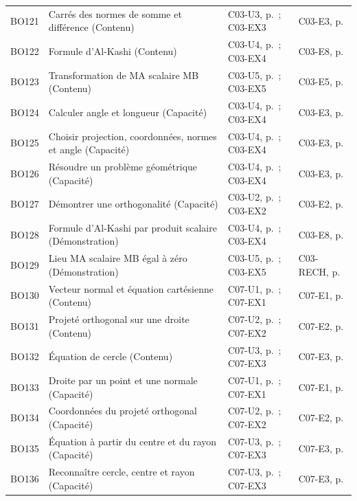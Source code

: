 \begin{longtable}{p{.1\linewidth}p{.43\linewidth}p{.19\linewidth}p{.16\linewidth}}
BO121 & Carrés des normes de somme et différence (Contenu) & C03-U3, p.\,\pageref{C03-U3} ; C03-EX3 & C03-E3, p.\,\pageref{C03-E3} \\
BO122 & Formule d’Al-Kashi (Contenu) & C03-U4, p.\,\pageref{C03-U4} ; C03-EX4 & C03-E8, p.\,\pageref{C03-E8} \\
BO123 & Transformation de MA scalaire MB (Contenu) & C03-U5, p.\,\pageref{C03-U5} ; C03-EX5 & C03-E5, p.\,\pageref{C03-E5} \\
BO124 & Calculer angle et longueur (Capacité) & C03-U4, p.\,\pageref{C03-U4} ; C03-EX4 & C03-E3, p.\,\pageref{C03-E3} \\
BO125 & Choisir projection, coordonnées, normes et angle (Capacité) & C03-U4, p.\,\pageref{C03-U4} ; C03-EX4 & C03-E3, p.\,\pageref{C03-E3} \\
BO126 & Résoudre un problème géométrique (Capacité) & C03-U4, p.\,\pageref{C03-U4} ; C03-EX4 & C03-E3, p.\,\pageref{C03-E3} \\
BO127 & Démontrer une orthogonalité (Capacité) & C03-U2, p.\,\pageref{C03-U2} ; C03-EX2 & C03-E2, p.\,\pageref{C03-E2} \\
BO128 & Formule d’Al-Kashi par produit scalaire (Démonstration) & C03-U4, p.\,\pageref{C03-U4} ; C03-EX4 & C03-E8, p.\,\pageref{C03-E8} \\
BO129 & Lieu MA scalaire MB égal à zéro (Démonstration) & C03-U5, p.\,\pageref{C03-U5} ; C03-EX5 & C03-RECH, p.\,\pageref{C03-RECH} \\
BO130 & Vecteur normal et équation cartésienne (Contenu) & C07-U1, p.\,\pageref{C07-U1} ; C07-EX1 & C07-E1, p.\,\pageref{C07-E1} \\
BO131 & Projeté orthogonal sur une droite (Contenu) & C07-U2, p.\,\pageref{C07-U2} ; C07-EX2 & C07-E2, p.\,\pageref{C07-E2} \\
BO132 & Équation de cercle (Contenu) & C07-U3, p.\,\pageref{C07-U3} ; C07-EX3 & C07-E3, p.\,\pageref{C07-E3} \\
BO133 & Droite par un point et une normale (Capacité) & C07-U1, p.\,\pageref{C07-U1} ; C07-EX1 & C07-E1, p.\,\pageref{C07-E1} \\
BO134 & Coordonnées du projeté orthogonal (Capacité) & C07-U2, p.\,\pageref{C07-U2} ; C07-EX2 & C07-E2, p.\,\pageref{C07-E2} \\
BO135 & Équation à partir du centre et du rayon (Capacité) & C07-U3, p.\,\pageref{C07-U3} ; C07-EX3 & C07-E3, p.\,\pageref{C07-E3} \\
BO136 & Reconnaître cercle, centre et rayon (Capacité) & C07-U3, p.\,\pageref{C07-U3} ; C07-EX3 & C07-E3, p.\,\pageref{C07-E3} \\

\end{longtable}
